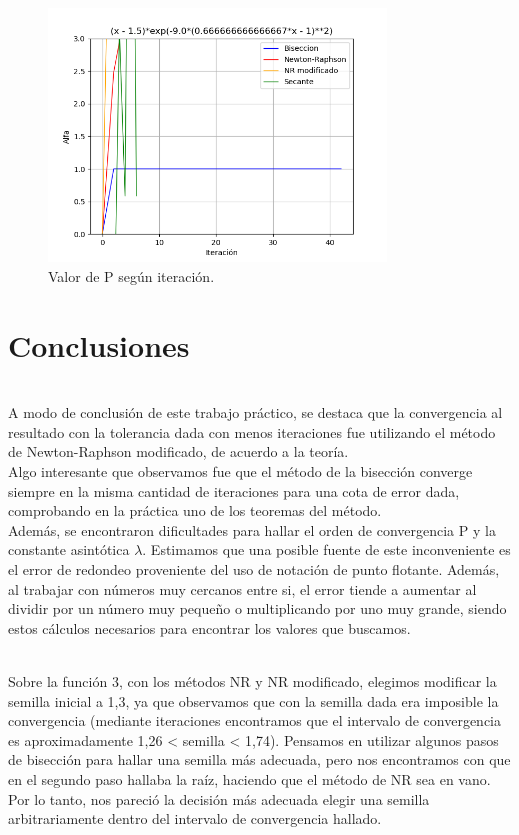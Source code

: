 \documentclass[titlepage,a4paper]{article}
\begin{document}
\begin{figure}[H]
    \centering
    \includegraphics[width=0.8\textwidth]{alfa f3.png}
    \caption{\label{fig:class01}Valor de P según iteración.}
\end{figure}


\section{Conclusiones}\label{sec:conclusiones}

\\A modo de conclusión de este trabajo práctico, se destaca que la convergencia al resultado con la tolerancia dada con menos iteraciones fue utilizando el método de Newton-Raphson modificado, de acuerdo a la teoría. 
\\Algo interesante que observamos fue que el método de la bisección converge siempre en la misma cantidad de iteraciones para una cota de error dada, comprobando en la práctica uno de los teoremas del método.
\\Además, se encontraron dificultades para hallar el orden de convergencia P y la constante asintótica $\lambda$. Estimamos que una posible fuente de este inconveniente es el error de redondeo proveniente del uso de notación de punto flotante. Además, al trabajar con números muy cercanos entre si, el error tiende a aumentar al dividir por un número muy pequeño o multiplicando por uno muy grande, siendo estos cálculos necesarios para encontrar los valores que buscamos. 
 
\\Sobre la función 3, con los métodos NR y NR modificado, elegimos modificar la semilla inicial a 1,3, ya que observamos que con la semilla dada era imposible la convergencia (mediante iteraciones encontramos que el intervalo de convergencia es aproximadamente 1,26 < semilla < 1,74). Pensamos en utilizar algunos pasos de bisección para hallar una semilla más adecuada, pero nos encontramos con que en el segundo paso hallaba la raíz, haciendo que el método de NR sea en vano. Por lo tanto, nos pareció la decisión más adecuada elegir una semilla arbitrariamente dentro del intervalo de convergencia hallado.
\end{document}
